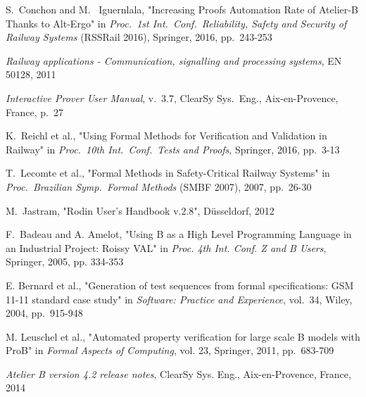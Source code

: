 \documentclass[11pt,journal]{IEEEtran}
\begin{document}
	\begin{thebibliography}{1}
		S.~Conchon and M.~ Iguernlala, "Increasing Proofs Automation Rate	of Atelier-B Thanks to Alt-Ergo" in \emph{Proc.~1st Int.~Conf.~Reliability, Safety and Security of Railway Systems} (RSSRail 2016), Springer, 2016, pp.~243-253
		
		\emph{Railway applications - Communication, signalling and processing systems}, EN 50128, 2011
		
		\emph{Interactive Prover User Manual}, v.~3.7, ClearSy Sys.~Eng., Aix-en-Provence, France, p.~27
		
		K.~Reichl et al., "Using Formal Methods for Verification and Validation in Railway" in \emph{Proc.~10th Int.~Conf.~Tests and Proofs}, Springer, 2016, pp.~3-13
		
		T.~Lecomte et al., "Formal Methods in Safety-Critical Railway Systems" in \emph{Proc.~Brazilian Symp.~Formal Methods} (SMBF 2007), 2007, pp.~26-30
		
		M.~Jastram, "Rodin User's Handbook v.2.8", D\"{u}sseldorf, 2012
		
		F.~Badeau and A. Amelot, "Using B as a High Level Programming Language in an Industrial Project: Roissy VAL" in \emph{Proc. 4th Int. Conf. Z and B Users}, Springer, 2005, pp. 334-353
		
		E. Bernard et al., "Generation of test sequences from formal specifications: GSM 11-11 standard case study" in \emph{Software: Practice and Experience}, vol.~34, Wiley, 2004, pp.~915-948
		
		M. Leuschel et al., "Automated property verification for large scale B models with ProB" in \emph{Formal Aspects of Computing}, vol. 23, Springer, 2011, pp.~683-709
		
		\emph{Atelier B version 4.2 release notes}, ClearSy Sys. Eng., Aix-en-Provence, France, 2014
		
		
	\end{thebibliography}
	
\end{document}
